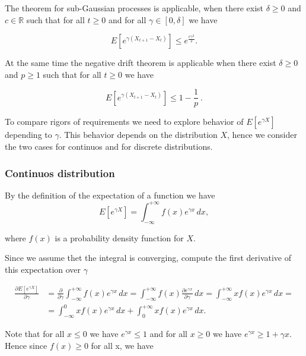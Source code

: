 \documentclass[12pt, a4paper]{article}
\theoremstyle{remark}
\theoremstyle{definition}
\begin{document}


The theorem for sub-Gaussian processes is applicable, when there exist $\delta \geq 0$ and $c \in \mathbb{R}$ such that for all $t \geq 0$ and for all $\gamma \in [0, \delta]$ we have

$$  E\left[e^{\gamma (X_{t + 1} - X_{t})}\right] \leq e^{\frac{c \gamma^2}{2}}.$$

At the same time the negative drift theorem is applicable when there exist $\delta \geq 0$ and $p \geq 1$ such that for all $t \geq 0$ we have

$$
    E\left[e^{\gamma (X_{t + 1} - X_{t})}\right] \leq 1 - \frac{1}{p}\ .$$

To compare rigors of requirements we need to explore behavior of $E[e^{\gamma X}]$ depending to $\gamma$. This behavior depends on the distribution $X$, hence we consider the two cases for continuos and for discrete distributions.

\subsubsection*{Continuos distribution}

By the definition of the expectation of a function we have
\[
    E[e^{\gamma X}] = \int_{-\infty}^{+\infty} f(x) e^{\gamma x} \,dx,
\]

where $f(x)$ is a probability density function for $X$.

\hfill

Since we assume thet the integral is converging, compute the first derivative of this expectation over $\gamma$

\begin{align*}
    \frac{\partial E[e^{\gamma X}]}{\partial \gamma} & = \frac{\partial}{\partial \gamma} \int_{-\infty}^{+\infty} f(x) e^{\gamma x} \, dx = \int_{-\infty}^{+\infty} f(x) \frac{\partial e^{\gamma x}}{\partial \gamma} \, dx = \int_{-\infty}^{+\infty} x f(x) e^{\gamma x} \, dx = \\
    & = \int_{-\infty}^{0} x f(x) e^{\gamma x} \, dx + \int_{0}^{+\infty} x f(x) e^{\gamma x} \, dx.
\end{align*}

Note that for all $x \leq 0$ we have $e^{\gamma x} \leq 1$ and for all $x \geq 0$ we have $e^{\gamma x} \geq 1 + \gamma x$. Hence since $f(x) \geq 0$ for all x, we have
\end{document}
